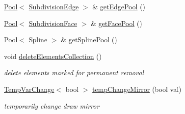 \begin{DoxyCompactItemize}
\item 
\hyperlink{classPool}{Pool}$<$ \hyperlink{classShipCAD_1_1SubdivisionEdge}{Subdivision\+Edge} $>$ \& \hyperlink{classShipCAD_1_1SubdivisionSurface_a899e459c7d5bd512dd2006c4c06a9b19}{get\+Edge\+Pool} ()
\item 
\hyperlink{classPool}{Pool}$<$ \hyperlink{classShipCAD_1_1SubdivisionFace}{Subdivision\+Face} $>$ \& \hyperlink{classShipCAD_1_1SubdivisionSurface_a00ddf343939772d829ac414cd976d345}{get\+Face\+Pool} ()
\item 
\hyperlink{classPool}{Pool}$<$ \hyperlink{classShipCAD_1_1Spline}{Spline} $>$ \& \hyperlink{classShipCAD_1_1SubdivisionSurface_a8dd10eab77ea0863f5f5e74d263cbae7}{get\+Spline\+Pool} ()
\item 
void \hyperlink{classShipCAD_1_1SubdivisionSurface_af052a1f171e5ee2d8048302b7e48706a}{delete\+Elements\+Collection} ()
\begin{DoxyCompactList}\small\item\em delete elements marked for permanent removal \end{DoxyCompactList}\item 
\hyperlink{classShipCAD_1_1TempVarChange}{Temp\+Var\+Change}$<$ bool $>$ \hyperlink{classShipCAD_1_1SubdivisionSurface_abbf1284012e5a2b433dbcf1ac2caaf84}{temp\+Change\+Mirror} (bool val)
\begin{DoxyCompactList}\small\item\em temporarily change draw mirror \end{DoxyCompactList}\end{DoxyCompactItemize}
